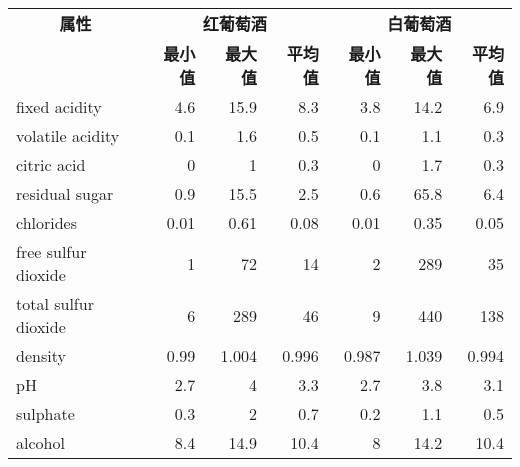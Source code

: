 \documentclass[a4paper, 11pt, hyperref, titlepage]{article}
\begin{document}
\begin{center}
\begin{tabular}{lrrrrrr}
\hline
\multicolumn{ 1}{c}{{\bf 属性}} &     \multicolumn{ 3}{c}{{\bf 红葡萄酒}} &     \multicolumn{ 3}{c}{{\bf 白葡萄酒}} \\

\multicolumn{ 1}{c}{} &  {\bf 最小值} &  {\bf 最大值} &  {\bf 平均值} &  {\bf 最小值} &  {\bf 最大值} &  {\bf 平均值} \\
\hline
fixed acidity &        4.6 &       15.9 &        8.3 &        3.8 &       14.2 &        6.9 \\

volatile acidity &        0.1 &        1.6 &        0.5 &        0.1 &        1.1 &        0.3 \\

citric acid &          0 &          1 &        0.3 &          0 &        1.7 &        0.3 \\

residual sugar &        0.9 &       15.5 &        2.5 &        0.6 &       65.8 &        6.4 \\

 chlorides &       0.01 &       0.61 &       0.08 &       0.01 &       0.35 &       0.05 \\

free sulfur dioxide &          1 &         72 &         14 &          2 &        289 &         35 \\

total sulfur dioxide &          6 &        289 &         46 &          9 &        440 &        138 \\

   density &       0.99 &      1.004 &      0.996 &      0.987 &      1.039 &      0.994 \\

        pH &        2.7 &          4 &        3.3 &        2.7 &        3.8 &        3.1 \\

  sulphate &        0.3 &          2 &        0.7 &        0.2 &        1.1 &        0.5 \\

   alcohol &        8.4 &       14.9 &       10.4 &          8 &       14.2 &       10.4 \\
\hline
\end{tabular}

\end{center}
\end{document}
